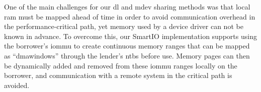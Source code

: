 \objperformance*%
%
%
One of the main challenges for our \gls{dl} and \gls{mdev} sharing methods was that local \gls{ram} must be mapped ahead of time in order to avoid communication overhead in the performance-critical path, yet memory used by a device driver can not be known in advance.
%
To overcome this, our SmartIO implementation supports using the \gls{borrower}'s \gls{iommu} to create continuous memory ranges that can be mapped as ``\glspl{dmawindow}'' through the \gls{lender}'s \glspl{ntb} before use.
%
Memory pages can then be dynamically added and removed from these \gls{iommu} ranges locally on the \gls{borrower}, and communication with a remote system in the critical path is avoided.
%



